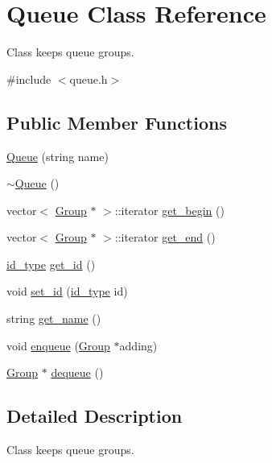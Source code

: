 \hypertarget{classQueue}{
\section{Queue Class Reference}
\label{d7/d56/classQueue}
}


Class keeps queue groups.  




{\ttfamily \#include $<$queue.h$>$}

\subsection*{Public Member Functions}
\begin{DoxyCompactItemize}
\item 
\hyperlink{classQueue_aee8e0d9677cef92e34f0347b73f64c97}{Queue} (string name)
\item 
\hyperlink{classQueue_a00d119db8fa3050da37746e82cbcf94f}{$\sim$Queue} ()
\item 
vector$<$ \hyperlink{classGroup}{Group} $\ast$ $>$::iterator \hyperlink{classQueue_adb1ae4097097c94935c6e8af1175e4af}{get\_\-begin} ()
\item 
vector$<$ \hyperlink{classGroup}{Group} $\ast$ $>$::iterator \hyperlink{classQueue_a43c7ba286ff9641d8ca0b195ef940db8}{get\_\-end} ()
\item 
\hyperlink{types_8h_a0b60c08a3ab1435cccc5643d32d8ccee}{id\_\-type} \hyperlink{classQueue_a69f2c1cee4763ed7671a4710cc9748c2}{get\_\-id} ()
\item 
void \hyperlink{classQueue_ad29a81e51660af6071684ad3c5b063f1}{set\_\-id} (\hyperlink{types_8h_a0b60c08a3ab1435cccc5643d32d8ccee}{id\_\-type} id)
\item 
string \hyperlink{classQueue_ab68f53f6e69bbe4f82b581716dc247d8}{get\_\-name} ()
\item 
void \hyperlink{classQueue_a651cb053c98529502dc84def4638771a}{enqueue} (\hyperlink{classGroup}{Group} $\ast$adding)
\item 
\hyperlink{classGroup}{Group} $\ast$ \hyperlink{classQueue_ad5eb8f94bae1af72ad3391fea1821c8b}{dequeue} ()
\end{DoxyCompactItemize}


\subsection{Detailed Description}
Class keeps queue groups. 

